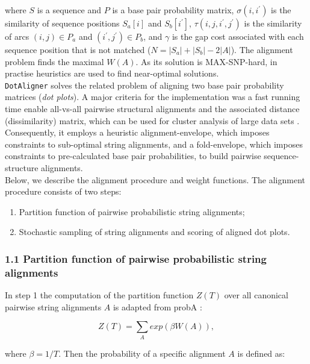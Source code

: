 \documentclass{bmcart}
\newcommand\dotaligner{\texttt{DotAligner}}
\begin{document}
\noindent where $S$ is a sequence and $P$ is a base pair probability matrix,
$\sigma(i,i^\prime)$ is the similarity of sequence positions $S_a[i]$ and
$S_b[i^\prime]$, $\tau(i,j,i^\prime,j^\prime)$ is the similarity of arcs $(i,j)
\in P_a$ and $(i^\prime,j^\prime) \in P_b$,
and $\gamma$ is the gap cost associated with each sequence position that is not
matched ($N = |S_a|+|S_b|-2|A|$). The alignment problem finds the maximal
$W(A)$. As its solution is MAX-SNP-hard, in practise heuristics are used to find
near-optimal solutions.\\

\dotaligner{} solves the related problem of aligning two base pair
probability matrices (\emph{dot plots}). A major criteria for the implementation was a fast
running time enable all-vs-all pairwise structural alignments and the 
associated distance (dissimilarity) matrix, which can be used for 
cluster analysis of large data sets \cite{Will17432929}. Consequently, 
it employs a heuristic alignment-envelope, 
which imposes constraints to sub-optimal string alignments, 
and a fold-envelope, which imposes constraints to pre-calculated base pair probabilities, 
to build pairwise sequence-structure alignments. \\

Below, we describe the alignment procedure and weight functions.
The alignment procedure consists of two steps:
\begin{enumerate}
  \item Partition function of pairwise probabilistic string alignments; 
  \item Stochastic sampling of string alignments and scoring of aligned dot plots.
\end{enumerate}

\subsubsection*{1.1 Partition function of pairwise probabilistic string alignments}
In step 1 the computation of the partition function $Z(T)$ over all canonical pairwise
string alignments $A$ is adapted from probA \cite{Muckstein12385998}:

\begin{equation}\label{probA_Z}
	Z(T) = \sum_A exp( \beta W(A) ),
\end{equation}

\noindent where $\beta = 1/T$. Then the probability of a specific alignment $A$ is defined as:
\end{document}
